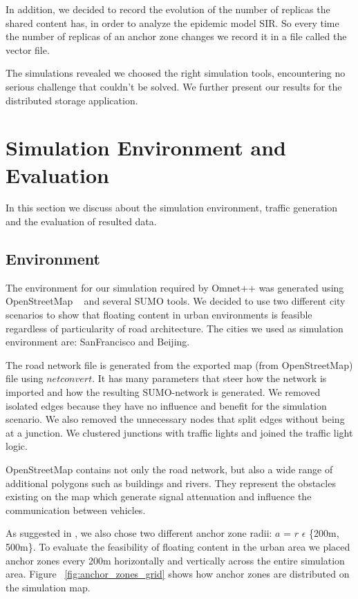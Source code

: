 In addition, we decided to record the evolution of the number of replicas the
shared content has, in order to analyze the epidemic model SIR. So every time
the number of replicas of an anchor zone changes we record it in a file called
the vector file.

The simulations revealed we choosed the right simulation tools, encountering no
serious challenge that couldn't be solved. We further present our results for
the distributed storage application.
 

\chapter{Simulation Environment and Evaluation}

In this section we discuss about the simulation environment, traffic
generation and the evaluation of resulted data.

\section{Environment}

The environment for our simulation required by Omnet++ was generated using
OpenStreetMap ~\cite{openstreetmap} and several SUMO tools. We decided to use
two different city scenarios to show that floating content in urban
environments is feasible regardless of particularity of road architecture. The
cities we used as simulation environment are: SanFrancisco and Beijing.

The road network file is generated from the exported map (from OpenStreetMap)
file using $netconvert$. It has many parameters that steer how the network is
imported and how the resulting SUMO-network is generated. We removed
isolated edges because they have no influence and benefit for the simulation
scenario. We also removed the unnecessary nodes that split edges without being
at a junction. We clustered junctions with traffic lights and joined the traffic
light logic.

OpenStreetMap contains not only the road network, but also a wide range of
additional polygons such as buildings and rivers. They represent the obstacles
existing on the map which generate signal attenuation and influence the
communication between vehicles.

As suggested in \cite{percomfloatingcontent}, we also chose two different anchor
zone radii: $a$ = $r$ $\epsilon$ \{200m, 500m\}. To evaluate the feasibility of
floating content in the urban area we placed anchor zones every 200m
horizontally and vertically across the entire simulation area. Figure
~\ref{fig:anchor_zones_grid} shows how anchor zones are distributed on the
simulation map.

